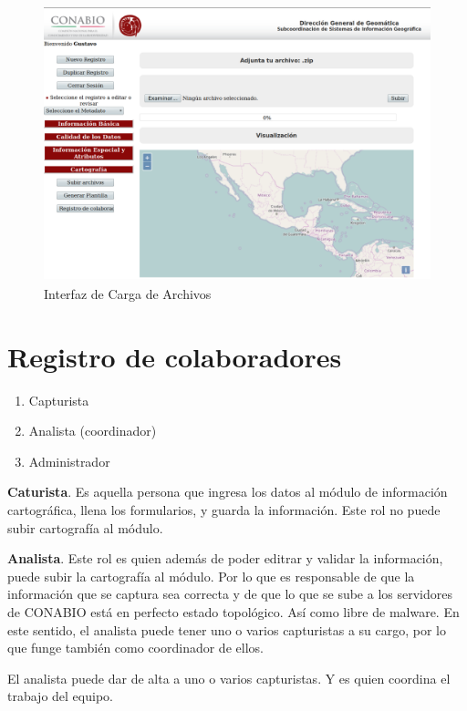 \documentclass[twoside]{book}
\begin{document}
\begin{figure}[h!] %
	\includegraphics[width=12cm, height=8cm]{img/cartografiaCargaArchivos} %
	\caption{Interfaz de Carga de Archivos}
\end{figure}
\section{Registro de colaboradores}

\begin{enumerate}
\item Capturista
\item Analista (coordinador)
\item Administrador
\end{enumerate}

\textbf{Caturista}. Es aquella persona que ingresa los datos al módulo de información cartográfica, llena los formularios, y guarda la información. Este rol no puede subir cartografía al módulo.

\textbf{Analista}. Este rol es quien además de poder editrar y validar la información, puede subir la cartografía al módulo. Por lo que es responsable de que la información que se captura sea correcta y de que lo que se sube a los servidores de CONABIO está en perfecto estado topológico. Así como libre de malware. En este sentido, el analista puede tener uno o varios capturistas a su cargo, por lo que funge también como coordinador de ellos.

El analista puede dar de alta a uno o varios capturistas. Y es quien coordina el trabajo del equipo.   
\end{document}
